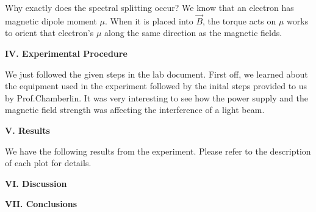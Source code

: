 \documentclass[fleqn]{article}
\begin{document}
  Why exactly does the spectral splitting occur? We know that an electron has magnetic dipole moment $\mu$. When it is placed into 
  $\overrightarrow{B}$, the torque acts on $\mu$ works to orient that electron's $\mu$ along the same direction as the magnetic fields.


  \vspace{20px}

  \textbf{IV. Experimental Procedure}

  \vspace{10px}

  We just followed the given steps in the
  lab document. First off, we learned about the equipment used in the experiment followed by the inital steps provided to us by 
  Prof.Chamberlin. It was very interesting to see how the power supply and the magnetic field strength was affecting the interference 
  of a light beam. \textcite{Five}

  \vspace{20px}

  \textbf{V. Results}

  \vspace{10px}

  We have the following results from the experiment. Please refer to the description of each plot
  for details.

  \vspace{20px}

  \textbf{VI. Discussion}

  \textbf{VII. Conclusions}

  \printbibliography
\end{document}
